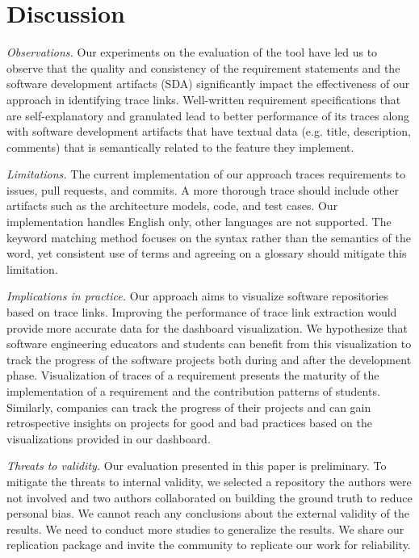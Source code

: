 \section{Discussion}
\label{sec:discuss}

\emph{Observations.} Our experiments on the evaluation of the tool have led us to observe that the quality and consistency of the requirement statements and the software development artifacts (SDA) significantly impact the effectiveness of our approach in identifying trace links. Well-written requirement specifications that are self-explanatory and granulated lead to better performance of its traces along with software development artifacts that have textual data (e.g. title, description, comments) that is semantically related to the feature they implement.

\emph{Limitations.} The current implementation of our approach traces requirements to issues, pull requests, and commits. A more thorough trace should include other artifacts such as the architecture models, code, and test cases. Our implementation handles English only, other languages are not supported. The keyword matching method focuses on the syntax rather than the semantics of the word, yet consistent use of terms and agreeing on a glossary should mitigate this limitation.

\emph{Implications in practice.} Our approach aims to visualize software repositories based on trace links. Improving the performance of trace link extraction would provide more accurate data for the dashboard visualization. We hypothesize that software engineering educators and students can benefit from this visualization to track the progress of the software projects both during and after the development phase. Visualization of traces of a requirement presents the maturity of the implementation of a requirement and the contribution patterns of students. Similarly, companies can track the progress of their projects and can gain retrospective insights on projects for good and bad practices based on the visualizations provided in our dashboard.

\emph{Threats to validity.} Our evaluation presented in this paper is preliminary. To mitigate the threats to internal validity, we selected a repository the authors were not involved and two authors collaborated on building the ground truth to reduce personal bias. We cannot reach any conclusions about the external validity of the results. We need to conduct more studies to generalize the results. We share our replication package and invite the community to replicate our work for reliability.





